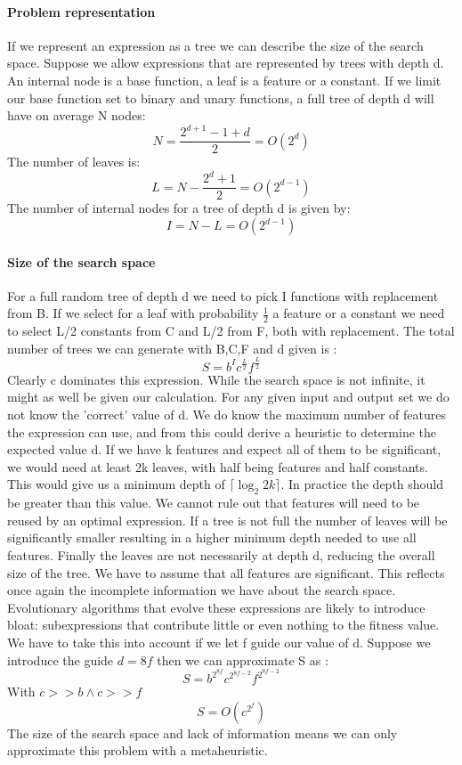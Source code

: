 \paragraph{Problem representation}
If we represent an expression as a tree we can describe the size of the search space. Suppose we allow expressions that are represented by trees with depth d. An internal node is a base function, a leaf is a feature or a constant. If we limit our base function set to binary and unary functions, a full tree of depth d will have on average N nodes:
\[
N = \frac{2^{d+1} - 1 + d}{2} = O(2^d)
\]
The number of leaves is:
\[
L = N - \frac{2^{d} + 1}{2} = O(2^{d-1})
\]
The number of internal nodes for a tree of depth d is given by:
\[
I = N - L = O(2^{d-1})
\]

\paragraph{Size of the search space}\label{searchspace}
For a full random tree of depth d we need to pick I functions with replacement from B.
If we select for a leaf with probability $\frac{1}{2}$ a feature or a constant we need to select L/2 constants from C and L/2 from F, both with replacement.
The total number of trees we can generate with B,C,F and d given is :
\[
S = b^I c^{\frac{L}{2}} f^{\frac{L}{2}}
\]
Clearly c dominates this expression. While the search space is not infinite, it might as well be given our calculation. For any given input and output set we do not know the 'correct' value of d. We do know the maximum number of features the expression can use, and from this could derive a heuristic to determine the expected value d. If we have k features and expect all of them to be significant, we would need at least 2k leaves, with half being features and half constants. This would give us a minimum depth of $\lceil \log_2{2k} \rceil$. In practice the depth should be greater than this value. We cannot rule out that features will need to be reused by an optimal expression. If a tree is not full the number of leaves will be significantly smaller resulting in a higher minimum depth needed to use all features. Finally the leaves are not necessarily at depth d, reducing the overall size of the tree. We have to assume that all features are significant. This reflects once again the incomplete information we have about the search space. Evolutionary algorithms that evolve these expressions are likely to introduce bloat: subexpressions that contribute little or even nothing to the fitness value. We have to take this into account if we let f guide our value of d. Suppose we introduce the guide $d = 8 f$ then we can approximate S as :
\[
S = b^{2^{8f}} c^{2^{8f-2}} f^{2^{8f-2}}
\]
With $ c >> b \land c >> f $
\[
S = O(c^{2^f})
\]
The size of the search space and lack of information means we can only approximate this problem with a metaheuristic.


